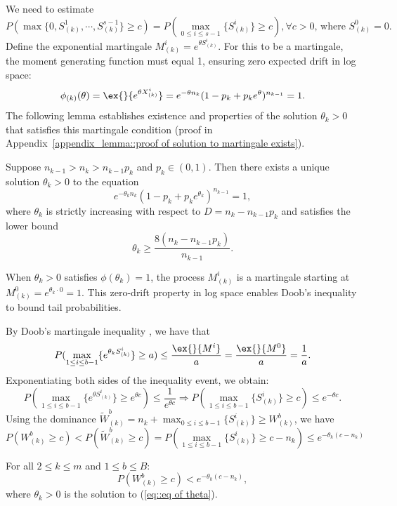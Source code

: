 We need to estimate
$$P\left( \max\{0,S^1_{(k)},\cdots,S^{s-1}_{(k)}\} \ge c\right)=P\left( \max_{0\leq i\leq s-1}\{S^i_{(k)}\} \ge c\right), \forall c>0 ,\,\text{where }S^0_{(k)}=0.$$
Define the exponential martingale $M^i_{(k)} = e^{\theta S^i_{(k)}}$. For this to be a martingale, the moment generating function must equal 1, ensuring zero expected drift in log space:
$$\phi_{(k)}(\theta) = \ex{}{e^{\theta X_{(k)}^i}}= e^{-\theta n_{k}}(1-p_k+p_ke^{\theta})^{n_{k-1}} = 1.$$
The following lemma establishes existence and properties of the solution $\theta_k > 0$ that satisfies this martingale condition (proof in Appendix~\ref{appendix_lemma::proof of solution to martingale exists}).
\begin{lemma}\label{lemma::solution to martingale exists}
Suppose \(n_{k-1} > n_k > n_{k-1} p_k\) and \(p_k \in (0, 1)\). Then there exists a unique solution \(\theta_k > 0\) to the equation
\begin{equation}
    e^{-\theta_k n_k} (1 - p_k + p_k e^{\theta_k})^{n_{k-1}} = 1, \label{eq::eq of theta}
\end{equation}
where \(\theta_k\) is strictly increasing with respect to \(D = n_k - n_{k-1} p_k\) and satisfies the lower bound
\[
\theta_k \geq \frac{8 (n_k - n_{k-1} p_k)}{n_{k-1}}.
\]
\end{lemma}
When $\theta_k>0$ satisfies $\phi(\theta_k)=1$, the process $M^i_{(k)}$ is a martingale starting at $M^0_{(k)}= e^{\theta_k \cdot 0}=1$. This zero-drift property in log space enables Doob's inequality to bound tail probabilities.

By Doob's martingale inequality \citep{durrett2019probability}, we have that
$$P(\max_{1\leq i
\leq b-1}\{ e^{\theta_k S^i_{(k)}} \}\geq a)\leq \frac{\ex{}{M^i}}{a} = \frac{\ex{}{M^0}}{a}= \frac{1}{a}.$$
Exponentiating both sides of the inequality event, we obtain:
$$P(\max_{1\leq i
\leq b-1}\{ e^{\theta S^i_{(k)}}\} \geq e^{\theta c})\leq \frac{1}{e^{\theta c}}  \Rightarrow P(\max_{1\leq i
\leq b-1}\{  S^i_{(k)}\} \geq c)\leq e^{-\theta c}.$$
Using the dominance $\tilde{W}^b_{(k)} = n_k + \max_{0\leq i\leq b-1}\{ S^i_{(k)}\} \geq W^b_{(k)}$, we have
$$P\left(  W^b_{(k)}\geq c  \right) <P\left(  \tilde{W}^b_{(k)}\geq c  \right) = P(\max_{1\leq i
\leq b-1}\{  S^i_{(k)}\} \geq c - n_k)\leq e^{-\theta_k (c - n_k)}$$

For all $2\leq k\leq m$ and $1\leq b\leq B$:
$$P\left(  W^b_{(k)}\geq c  \right)< e^{-\theta_k (c - n_k)},$$
where $\theta_k>0$ is the solution to (\ref{eq::eq of theta}).

